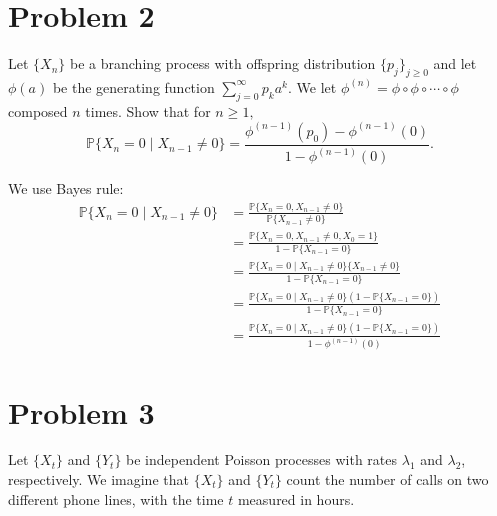 \documentclass[11pt]{article}
\newcommand{\bbP}{\mathbb{P}}
\begin{document}
\section*{Problem 2}
\begin{problem}
    Let $\{X_n\}$ be a branching process with offspring distribution $\{p_j\}_{j \geq 0}$ and let $\phi(a)$ be the generating function $\sum_{j=0}^\infty p_ka^k.$ We let $\phi^{(n)} = \phi \circ \phi \circ \cdots \circ \phi$ composed $n$ times. Show that for $n\geq 1,$ 
    \[\bbP\{X_n = 0 \mid X_{n-1} \neq 0\} = \frac{\phi^{(n-1)}(p_0) - \phi^{(n-1)}(0)}{1 - \phi^{(n-1)}(0)}.\]
\end{problem}
\begin{solution}
    We use Bayes rule:
    \begin{align*}
        \bbP\{X_n = 0 \mid X_{n-1} \neq 0\} &= \frac{\bbP\{X_n = 0, X_{n-1} \neq 0\}}{\bbP\{X_{n-1} \neq 0\}}\\
        &= \frac{\bbP\{X_n = 0, X_{n-1} \neq 0, X_0 = 1\}}{1 - \bbP\{X_{n-1} = 0\}}\\
        &= \frac{\bbP\{X_n = 0\mid  X_{n-1} \neq 0\}\{X_{n-1} \neq 0\}}{1 - \bbP\{X_{n-1} = 0\}}\\
        &= \frac{\bbP\{X_n = 0\mid  X_{n-1} \neq 0\}(1 - \bbP\{X_{n-1} = 0\})}{1 - \bbP\{X_{n-1} = 0\}}\\
        &= \frac{\bbP\{X_n = 0\mid  X_{n-1} \neq 0\}(1 - \bbP\{X_{n-1} = 0\})}{1 - \phi^{(n-1)}(0)}
    \end{align*}
\end{solution}


\newpage
\section*{Problem 3}
Let \(\{X_t\}\) and \(\{Y_t\}\) be independent Poisson processes with rates \(\lambda_1\) and \(\lambda_2\), respectively. We imagine that \(\{X_t\}\) and \(\{Y_t\}\) count the number of calls on two different phone lines, with the time \(t\) measured in hours.
\end{document}
